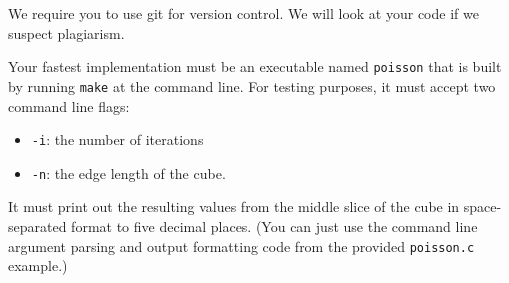\documentclass[a4paper,11pt]{article}
\newcommand{\code}[1]{\texttt{#1}}
\begin{document}
We require you to use git for version control.  We will look at your
code if we suspect plagiarism.

Your fastest implementation must be an executable named \code{poisson}
that is built by running \code{make} at the command line.  For testing
purposes, it must accept two command line flags:
\begin{itemize}
  \item \code{-i}: the number of iterations
  \item \code{-n}: the edge length of the cube.
\end{itemize}
It must print out the resulting values from the middle slice of the
cube in space-separated format to five decimal places.  (You can just
use the command line argument parsing and output formatting code from
the provided \code{poisson.c} example.)
\end{document}
